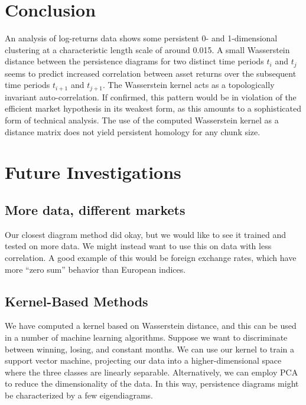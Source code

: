 \documentclass{article}
\begin{document}
\section{Conclusion}
\vspace{-15mm}
An analysis of log-returns data shows some persistent 0- and 1-dimensional clustering at a characteristic length scale of around 0.015. A small Wasserstein distance between the persistence diagrams for two distinct time periods $t_i$ and $t_j$ seems to predict increased correlation between asset returns over the subsequent time periods $t_{i+1}$ and $t_{j+1}$. The Wasserstein kernel acts as a topologically invariant auto-correlation. If confirmed, this pattern would be in violation of the efficient market hypothesis in its weakest form, as this amounts to a sophisticated form of technical analysis. The use of the computed Wasserstein kernel as a distance matrix does not yield persistent homology for any chunk size.

\section{Future Investigations}

\subsection{More data, different markets}
Our closest diagram method did okay, but we would like to see it trained and tested on more data. We might instead want to use this on data with less correlation. A good example of this would be foreign exchange rates, which have more “zero sum” behavior than European indices.

\subsection{Kernel-Based Methods}
We have computed a kernel based on Wasserstein distance, and this can be used in a number of machine learning algorithms. Suppose we want to discriminate between winning, losing, and constant months. We can use our kernel to train a support vector machine, projecting our data into a higher-dimensional space where the three classes are linearly separable. Alternatively, we can employ PCA to reduce the dimensionality of the data. In this way, persistence diagrams might be characterized by a few eigendiagrams.
\end{document}
